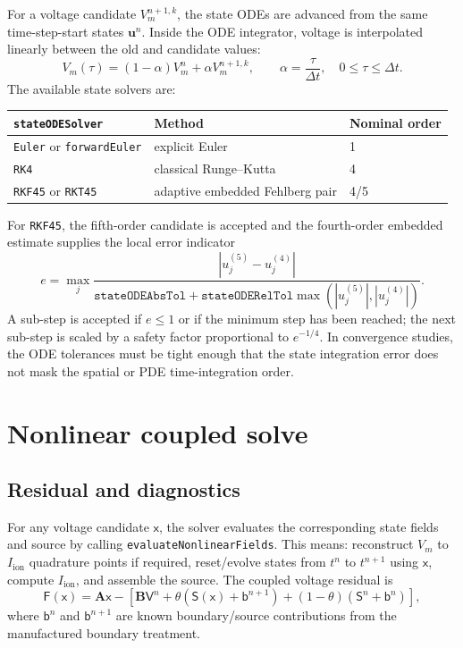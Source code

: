 \documentclass[11pt,a4paper]{article}
\newcommand{\code}[1]{\texttt{\small #1}}
\newcommand{\Vm}{V_m}
\newcommand{\Iion}{I_{\mathrm{ion}}}
\newcommand{\Aimp}{\mathbf{A}}
\newcommand{\Bimp}{\mathbf{B}}
\newcommand{\Fres}{\mathsf{F}}
\begin{document}
For a voltage candidate $\Vm^{n+1,k}$, the state ODEs are advanced from the
same time-step-start states $\mathbf{u}^n$. Inside the ODE integrator, voltage
is interpolated linearly between the old and candidate values:
\begin{equation}
  \Vm(\tau)
  =
  (1-\alpha)\Vm^n+\alpha \Vm^{n+1,k},
  \qquad
  \alpha=\frac{\tau}{\Delta t},\quad 0\le \tau\le \Delta t.
  \label{eq:ode-vm-interpolation}
\end{equation}
The available state solvers are:
\begin{center}
\begin{tabular}{@{}lll@{}}
\toprule
\code{stateODESolver} & Method & Nominal order \\
\midrule
\code{Euler} or \code{forwardEuler} & explicit Euler & 1 \\
\code{RK4} & classical Runge--Kutta & 4 \\
\code{RKF45} or \code{RKT45} & adaptive embedded Fehlberg pair & 4/5 \\
\bottomrule
\end{tabular}
\end{center}
For \code{RKF45}, the fifth-order candidate is accepted and the fourth-order
embedded estimate supplies the local error indicator
\begin{equation}
  e =
  \max_j
  \frac{|u^{(5)}_j-u^{(4)}_j|}
       {\texttt{stateODEAbsTol}+
        \texttt{stateODERelTol}\max(|u^{(5)}_j|,|u^{(4)}_j|)}.
\end{equation}
A sub-step is accepted if $e\le 1$ or if the minimum step has been reached; the
next sub-step is scaled by a safety factor proportional to $e^{-1/4}$. In
convergence studies, the ODE tolerances must be tight enough that the state
integration error does not mask the spatial or PDE time-integration order.

\section{Nonlinear coupled solve}

\subsection{Residual and diagnostics}

For any voltage candidate $\mathsf{x}$, the solver evaluates the corresponding
state fields and source by calling \code{evaluateNonlinearFields}. This means:
reconstruct $\Vm$ to $\Iion$ quadrature points if required, reset/evolve states
from $t^n$ to $t^{n+1}$ using $\mathsf{x}$, compute $\Iion$, and assemble the
source. The coupled voltage residual is
\begin{equation}
  \Fres(\mathsf{x})
  =
  \Aimp\mathsf{x}
  -
  \left[
    \Bimp\mathsf{V}^{n}
    +\theta\left(\mathsf{S}(\mathsf{x})+\mathsf{b}^{n+1}\right)
    +(1-\theta)\left(\mathsf{S}^{n}+\mathsf{b}^{n}\right)
  \right],
  \label{eq:nonlinear-residual}
\end{equation}
where $\mathsf{b}^{n}$ and $\mathsf{b}^{n+1}$ are known boundary/source
contributions from the manufactured boundary treatment.
\end{document}
